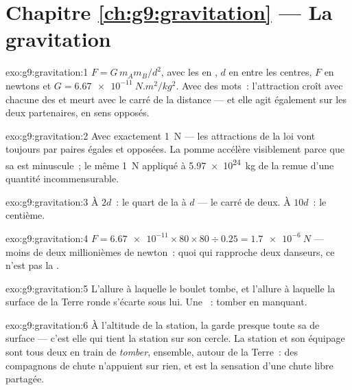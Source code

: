 \section*{Chapitre \ref{ch:g9:gravitation} --- La gravitation}

\begin{solution}{exo:g9:gravitation:1}
$F = G \, m_A m_B / d^2$, avec les  en , $d$ en
 entre les centres, $F$ en newtons et
$G = \qty{6.67e-11}{N.m^2/kg^2}$. Avec des mots~: l'attraction croît
avec chacune des  et meurt avec le carré de la distance --- et
elle agit également sur les deux partenaires, en sens opposés.
\end{solution}

\begin{solution}{exo:g9:gravitation:2}
Avec exactement \qty{1}{N} --- les attractions de la loi vont toujours
par paires égales et opposées. La pomme accélère visiblement parce que
sa  est minuscule~; le même \qty{1}{N} appliqué à
\qty{5.97e24}{kg} de  la remue d'une quantité incommensurable.
\end{solution}

\begin{solution}{exo:g9:gravitation:3}
À $2d$~: le quart de la  à $d$ --- le carré de deux. À $10d$~:
le centième.
\end{solution}

\begin{solution}{exo:g9:gravitation:4}
$F = \num{6.67e-11} \times 80 \times 80 \div 0.25 =
\qty{1.7e-6}{N}$ --- moins de deux millionièmes de newton~: quoi qui
rapproche deux danseurs, ce n'est pas la .
\end{solution}

\begin{solution}{exo:g9:gravitation:5}
L'allure à laquelle le boulet tombe, et l'allure à laquelle la surface
de la Terre ronde s'écarte sous lui. Une ~: tomber en manquant.
\end{solution}

\begin{solution}{exo:g9:gravitation:6}
À l'altitude de la station, la  garde presque toute sa
 de surface --- c'est elle qui tient la station sur son cercle.
La station et son équipage sont tous deux en train de \emph{tomber},
ensemble, autour de la Terre~: des compagnons de chute n'appuient sur
rien, et  est la sensation d'une chute libre partagée.
\end{solution}


